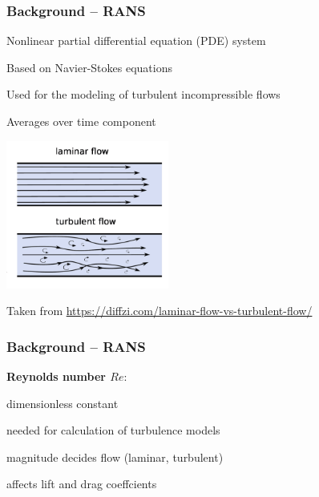
\begin{frame}
    \frametitle{Background -- RANS}
	\vspace*{8mm}
\begin{multicols}{2}
\begin{PraesentationAufzaehlung}
\item Nonlinear partial differential equation (PDE) system
\item Based on Navier-Stokes equations
\item Used for the modeling of turbulent incompressible flows
\item Averages over time component
\end{PraesentationAufzaehlung}
\vfill\columnbreak
\includegraphics[width=0.4\textwidth, height=.55\textheight]{./Ressourcen/Praesentation/Bilder/laminar_turbulent.png}

\end{multicols}
\vspace*{-4mm}
Taken from \url{https://diffzi.com/laminar-flow-vs-turbulent-flow/}
\end{frame}
\clearpage

\begin{frame}
    \frametitle{Background -- RANS}
	\vspace*{8mm}
	\textbf{Reynolds number $Re$}:

\begin{PraesentationAufzaehlung}
		\item dimensionless constant
		\item needed for calculation of turbulence models
		\item magnitude decides flow (laminar, turbulent)
		\item  affects lift and drag coeffcients
\end{PraesentationAufzaehlung}

\end{frame}
\clearpage

